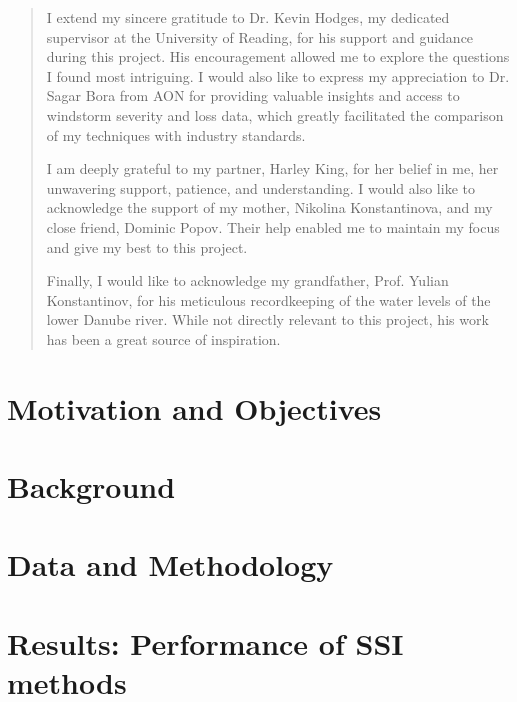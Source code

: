 \documentclass[12pt, a4paper, onecolumn]{report}
\begin{document}




\renewcommand{\abstractname}{Acknowledgements}
\begin{abstract}
    I extend my sincere gratitude to Dr. Kevin Hodges, my dedicated supervisor at the University of Reading, for his support and guidance during this project. His encouragement allowed me to explore the questions I found most intriguing. I would also like to express my appreciation to Dr. Sagar Bora from AON for providing valuable insights and access to windstorm severity and loss data, which greatly facilitated the comparison of my techniques with industry standards. \newline

    I am deeply grateful to my partner, Harley King, for her belief in me, her unwavering support, patience, and understanding. I would also like to acknowledge the support of my mother, Nikolina Konstantinova, and my close friend, Dominic Popov. Their help enabled me to maintain my focus and give my best to this project.\newline

    Finally, I would like to acknowledge my grandfather, Prof. Yulian Konstantinov, for his meticulous recordkeeping of the water levels of the lower Danube river. While not directly relevant to this project, his work has been a great source of inspiration.
\end{abstract}

\tableofcontents




\chapter{Motivation and Objectives}
    

\chapter{Background}
    

\chapter{Data and Methodology}
    

\chapter{Results: Performance of SSI methods}
    
\end{document}
